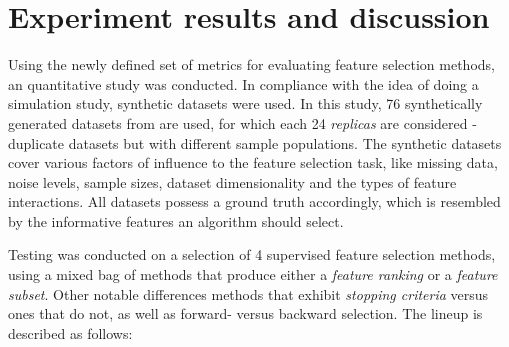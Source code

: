 \documentclass{article}
\begin{document}
\section{Experiment results and discussion}
Using the newly defined set of metrics for evaluating feature selection methods, an quantitative study was conducted. In compliance with the idea of doing a simulation study, synthetic datasets were used. In this study, 76 synthetically generated datasets from \citep{urbanowicz2018benchmarking} are used, for which each 24 \textit{replicas} are considered - duplicate datasets but with different sample populations. The synthetic datasets cover various factors of influence to the feature selection task, like missing data, noise levels, sample sizes, dataset dimensionality and the types of feature interactions. All datasets possess a ground truth accordingly, which is resembled by the informative features an algorithm should select.

Testing was conducted on a selection of 4 supervised feature selection methods, using a mixed bag of methods that produce either a \textit{feature ranking} or a \textit{feature subset}. Other notable differences methods that exhibit \textit{stopping criteria} versus ones that do not, as well as forward- versus backward selection. The lineup is described as follows:
\end{document}

